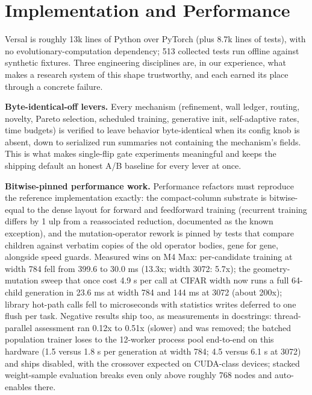 \documentclass[11pt]{article}
\begin{document}
\section{Implementation and Performance}

Versal is roughly 13k lines of Python over PyTorch (plus 8.7k lines of tests), with no evolutionary-computation dependency; 513 collected tests run offline against synthetic fixtures. Three engineering disciplines are, in our experience, what makes a research system of this shape trustworthy, and each earned its place through a concrete failure.

\textbf{Byte-identical-off levers.} Every mechanism (refinement, wall ledger, routing, novelty, Pareto selection, scheduled training, generative init, self-adaptive rates, time budgets) is verified to leave behavior byte-identical when its config knob is absent, down to serialized run summaries not containing the mechanism's fields. This is what makes single-flip gate experiments meaningful and keeps the shipping default an honest A/B baseline for every lever at once.

\textbf{Bitwise-pinned performance work.} Performance refactors must reproduce the reference implementation exactly: the compact-column substrate is bitwise-equal to the dense layout for forward and feedforward training (recurrent training differs by 1 ulp from a reassociated reduction, documented as the known exception), and the mutation-operator rework is pinned by tests that compare children against verbatim copies of the old operator bodies, gene for gene, alongside speed guards. Measured wins on M4 Max: per-candidate training at width 784 fell from 399.6 to 30.0 ms (13.3x; width 3072: 5.7x); the geometry-mutation sweep that once cost 4.9 s per call at CIFAR width now runs a full 64-child generation in 23.6 ms at width 784 and 144 ms at 3072 (about 200x); library hot-path calls fell to microseconds with statistics writes deferred to one flush per task. Negative results ship too, as measurements in docstrings: thread-parallel assessment ran 0.12x to 0.51x (slower) and was removed; the batched population trainer loses to the 12-worker process pool end-to-end on this hardware (1.5 versus 1.8 s per generation at width 784; 4.5 versus 6.1 s at 3072) and ships disabled, with the crossover expected on CUDA-class devices; stacked weight-sample evaluation breaks even only above roughly 768 nodes and auto-enables there.
\end{document}

